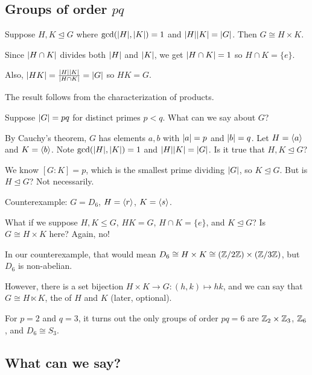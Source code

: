 \documentclass[12pt,letterpaper]{report}
\begin{document}
\subsection[Groups of order pq]{Groups of order $pq$}

\begin{lem}{}{}
  Suppose $H, K \trianglelefteq G$ where $\gcd(\lvert H\rvert, \lvert K\rvert) = 1$ and
  $\lvert H\rvert\lvert K\rvert = \lvert G\rvert$.
  Then $G \cong H \times K$.
\end{lem}

\begin{thmproof}
  Since $\lvert H \cap K\rvert$ divides both $\lvert H\rvert$ and $\lvert K\rvert$, we get $\lvert H \cap K\rvert = 1$ so
  $H \cap K = \{e\}$.

  Also, $\lvert HK\rvert = \frac{\lvert H\rvert\lvert K\rvert}{\lvert H \cap K\rvert} = \lvert G\rvert$ so $HK = G$.

  The result follows from the characterization of products.
\end{thmproof}

Suppose $\lvert G\rvert = pq$ for distinct primes $p < q$.
What can we say about $G$?

By Cauchy's theorem, $G$ has elements $a, b$ with $\lvert a\rvert = p$ and $\lvert b\rvert = q$.
Let $H = \langle a\rangle$ and $K = \langle b\rangle$.
Note $\gcd(\lvert H\rvert, \lvert K\rvert) = 1$ and $\lvert H\rvert\lvert K\rvert = \lvert G\rvert$.
Is it true that $H, K \trianglelefteq G$?

We know $[G : K] = p$, which is the smallest prime dividing $\lvert G\rvert$, so $K \trianglelefteq G$.
But is $H \trianglelefteq G$?
Not necessarily.

Counterexample: $G = D_6$, $H = \langle r\rangle$, $K = \langle s\rangle$.

What if we suppose $H, K \leq G$, $HK = G$, $H \cap K = \{e\}$, and $K \trianglelefteq G$?
Is $G \cong H \times K$ here?
Again, no!

In our counterexample, that would mean $D_6 \cong H \times K \cong (\mathbb{Z}/{2}\mathbb{Z}) \times (\mathbb{Z}/{3}\mathbb{Z})$,
but $D_6$ is non-abelian.

However, there is a set bijection $H \times K \to G : (h, k) \mapsto hk$, and we can say that
$G \cong H \ltimes K$, the  of $H$ and $K$ (later, optional).

For $p = 2$ and $q = 3$, it turns out the only groups of order $pq = 6$ are
$\mathbb{Z}_2 \times \mathbb{Z}_3$, $\mathbb{Z}_6$, and $D_6 \cong S_3$.

\pagebreak
\subsection{What can we say?}
\end{document}
